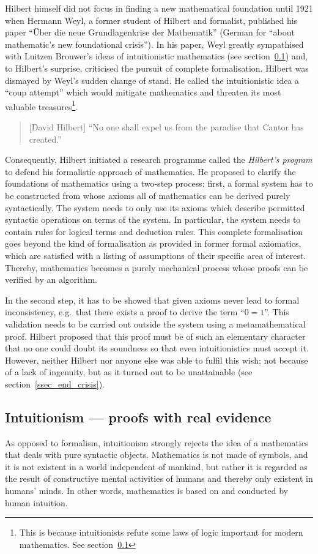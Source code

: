 \documentclass[hidelinks]{article}
\begin{document}
Hilbert himself did not focus in finding a new mathematical foundation until 1921 when Hermann Weyl, a former student of Hilbert and formalist, published his paper ``Über die neue Grundlagenkrise der Mathematik'' (German for ``about mathematic's new foundational crisis''). In his paper, Weyl greatly sympathised with Luitzen Brouwer's ideas of intuitionistic mathematics (see section~\ref{ssec_intuitionism}) and, to Hilbert's surprise, criticised the pursuit of complete formalisation. Hilbert was dismayed by Weyl's sudden change of stand. He called the intuitionistic idea a ``coup attempt'' which would mitigate mathematics and threaten its most valuable treasures\footnote{This is because intuitionists refute some laws of logic important for modern mathematics. See section~\ref{ssec_intuitionism}}.\cite{hilbert_coup}
\begin{quote}[David Hilbert]
``No one shall expel us from the paradise that Cantor has created.''\cite{hilbert_paradise}
\end{quote}
Consequently, Hilbert initiated a research programme called the \textit{Hilbert's program} to defend his formalistic approach of mathematics. He proposed to clarify the foundations of mathematics using a two-step process: first, a formal system has to be constructed from whose axioms all of mathematics can be derived purely syntactically. The system needs to only use its axioms which describe permitted syntactic operations on terms of the system. In particular, the system needs to contain rules for logical terms and deduction rules. This complete formalisation goes beyond the kind of formalisation as provided in former formal axiomatics, which are satisfied with a listing of assumptions of their specific area of interest. Thereby, mathematics becomes a purely mechanical process whose proofs can be verified by an algorithm.

In the second step, it has to be showed that given axioms never lead to formal inconsistency, e.g.\ that there exists a proof to derive the term ``$0=1$''. This validation needs to be carried out outside the system using a metamathematical proof. Hilbert proposed that this proof must be of such an elementary character that no one could doubt its soundness so that even intuitionistics must accept it. However, neither Hilbert nor anyone else was able to fulfil this wish; not because of a lack of ingenuity, but as it turned out to be unattainable (see section~\ref{ssec_end_crisis}).

\subsection{Intuitionism --- proofs with real evidence}\label{ssec_intuitionism}
As opposed to formalism, intuitionism strongly rejects the idea of a mathematics that deals with pure syntactic objects. Mathematics is not made of symbols, and it is not existent in a world independent of mankind, but rather it is regarded as the result of constructive mental activities of humans and thereby only existent in humans' minds. In other words, mathematics is based on and conducted by human intuition.
\end{document}
